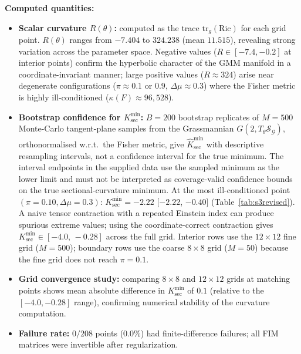 \documentclass[a4paper,fleqn]{cas-dc}
\newcommand{\calS}{\mathcal{S}}
\newcommand{\calG}{\mathcal{G}}
\begin{document}
\textbf{Computed quantities:}
\begin{itemize}
  \item \textbf{Scalar curvature $R(\theta)$:} computed as the trace
        $\mathrm{tr}_g(\mathrm{Ric})$ for each grid point.
        $R(\theta)$ ranges from $-7.404$ to $324.238$ (mean $11.515$),
        revealing strong variation across the parameter space.
        Negative values ($R \in [-7.4, -0.2]$ at interior points)
        confirm the hyperbolic character of the GMM manifold in a
        coordinate-invariant manner; large positive values ($R \approx 324$)
        arise near degenerate configurations ($\pi \approx 0.1$ or $0.9$,
        $\Delta\mu \approx 0.3$) where the Fisher metric is highly ill-conditioned
        ($\kappa(F) \approx 96{,}528$).
  \item \textbf{Bootstrap confidence for $K_{\sec}^{\min}$:}
        $B=200$ bootstrap replicates of $M=500$ Monte-Carlo tangent-plane samples
        from the Grassmannian $G(2, T_\theta\calS_{\calG})$, orthonormalised w.r.t.\
        the Fisher metric, give $\widehat{K}_{\sec}^{\min}$ with descriptive resampling intervals, not a confidence interval for the true minimum.
        The interval endpoints in the supplied data use the sampled minimum as the lower limit and must not be interpreted as coverage-valid confidence bounds on the true sectional-curvature minimum. At the most ill-conditioned point $(\pi=0.10, \Delta\mu=0.3)$:
        $K_{\sec}^{\min} = -2.22$ [$-2.22$, $-0.40$] (Table~\ref{tab:s3revised}).
        A naive tensor contraction with a repeated Einstein index can produce
        spurious extreme values; using the coordinate-correct contraction gives
        $K_{\sec}^{\min}\in[-4.0,\,-0.28]$
        across the full grid.
        Interior rows use the $12\times12$ fine grid ($M=500$); boundary rows
        use the coarse $8\times8$ grid ($M=50$) because the fine grid does not
        reach $\pi=0.1$.
  \item \textbf{Grid convergence study:} comparing $8\times8$ and
        $12\times12$ grids at matching points shows mean absolute difference in
        $K_{\sec}^{\min}$ of $0.1$ (relative to the $[-4.0, -0.28]$ range),
        confirming numerical stability of the curvature computation.
  \item \textbf{Failure rate:} $0/208$ points ($0.0\%$) had finite-difference
        failures; all FIM matrices were invertible after regularization.
\end{itemize}
\end{document}
